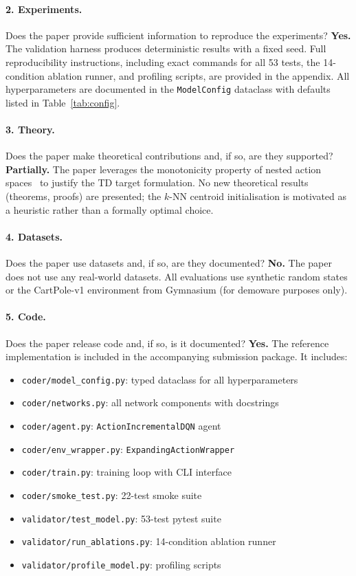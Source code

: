 \documentclass{article}
\begin{document}
\paragraph{2. Experiments.}
Does the paper provide sufficient information to reproduce the experiments?
\textbf{Yes.} The validation harness produces deterministic results with a
fixed seed. Full reproducibility instructions, including exact commands for all
53 tests, the 14-condition ablation runner, and profiling scripts, are provided
in the appendix. All hyperparameters are documented in the
\texttt{ModelConfig} dataclass with defaults listed in Table~\ref{tab:config}.

\paragraph{3. Theory.}
Does the paper make theoretical contributions and, if so, are they supported?
\textbf{Partially.} The paper leverages the monotonicity property of nested
action spaces~\cite{farquhar2020growing} to justify the TD target formulation.
No new theoretical results (theorems, proofs) are presented; the $k$-NN
centroid initialisation is motivated as a heuristic rather than a formally
optimal choice.

\paragraph{4. Datasets.}
Does the paper use datasets and, if so, are they documented?
\textbf{No.} The paper does not use any real-world datasets. All evaluations
use synthetic random states or the CartPole-v1 environment from Gymnasium (for
demoware purposes only).

\paragraph{5. Code.}
Does the paper release code and, if so, is it documented?
\textbf{Yes.} The reference implementation is included in the accompanying
submission package. It includes:
\begin{itemize}
  \item \texttt{coder/model\_config.py}: typed dataclass for all hyperparameters
  \item \texttt{coder/networks.py}: all network components with docstrings
  \item \texttt{coder/agent.py}: \texttt{ActionIncrementalDQN} agent
  \item \texttt{coder/env\_wrapper.py}: \texttt{ExpandingActionWrapper}
  \item \texttt{coder/train.py}: training loop with CLI interface
  \item \texttt{coder/smoke\_test.py}: 22-test smoke suite
  \item \texttt{validator/test\_model.py}: 53-test pytest suite
  \item \texttt{validator/run\_ablations.py}: 14-condition ablation runner
  \item \texttt{validator/profile\_model.py}: profiling scripts
\end{itemize}
\end{document}
